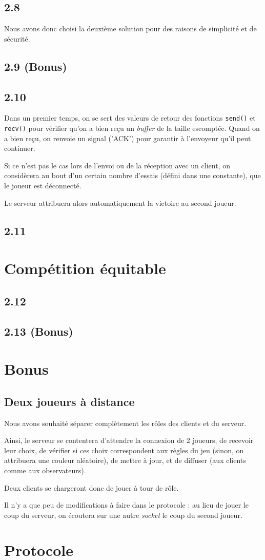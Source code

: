 \documentclass[12pt]{article}
\def\question#1{\subsection{#1}}
\def\sec#1{\section{#1}}
\begin{document}
\question{2.8}
Nous avons donc choisi la deuxième solution pour des raisons de simplicité et de sécurité.

\question{2.9 (Bonus)}

\question{2.10}
Dans un premier temps, on se sert des valeurs de retour des fonctions \texttt{send()} et \texttt{recv()} pour vérifier qu'on a bien reçu un \textit{buffer} de la taille escomptée.
Quand on a bien reçu, on renvoie un signal ('ACK') pour garantir à l'envoyeur qu'il peut continuer.

Si ce n'est pas le cas lors de l'envoi ou de la réception avec un client, on considèrera au bout d'un certain nombre d'essais (défini dans une constante), que le joueur est déconnecté.

Le serveur attribuera alors automatiquement la victoire au second joueur. %


\question{2.11}

\sec{Compétition équitable}
\question{2.12}
\question{2.13 (Bonus)}

\sec{Bonus}
\question{Deux joueurs à distance}
Nous avons souhaité séparer complètement les rôles des clients et du serveur.

Ainsi, le serveur se contentera d'attendre la connexion de 2 joueurs, de recevoir leur choix, de vérifier si ces choix correspondent aux règles du jeu (sinon, on attribuera une couleur aléatoire), de mettre à jour, et de diffuser (aux clients comme aux observateurs).

Deux clients se chargeront donc de jouer à tour de rôle.

Il n'y a que peu de modifications à faire dans le protocole : au lieu de jouer le coup du serveur, on écoutera sur une autre \textit{socket} le coup du second joueur.


\sec{Protocole}
\end{document}
